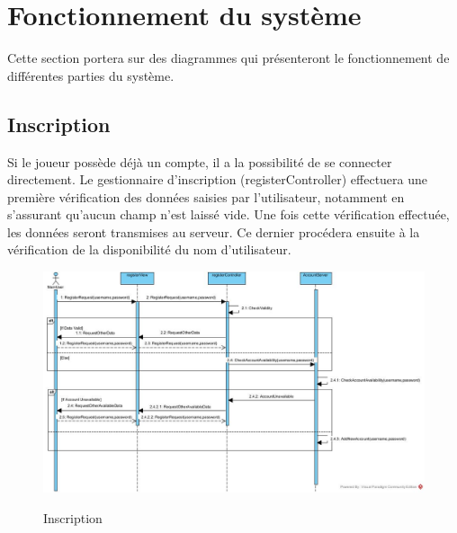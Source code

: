 \documentclass[../design_fonctionnement_sys.tex]{subfiles}
\begin{document}
\section{Fonctionnement du système}
Cette section portera sur des diagrammes qui présenteront le fonctionnement de différentes parties du système.

\subsection{Inscription}
Si le joueur possède déjà un compte, il a la possibilité de se connecter directement.
Le gestionnaire d'inscription (registerController) effectuera une première vérification des données saisies par l'utilisateur, 
notamment en s'assurant qu'aucun champ n'est laissé vide. 
Une fois cette vérification effectuée, les données seront transmises au serveur. 
Ce dernier procédera ensuite à la vérification de la disponibilité du nom d'utilisateur.

\begin{figure}[H]
    \centering
    \includegraphics[scale=0.4]{img_design/RegisterSD.jpg}
    \label{fig:seq_match_client}
    \caption{Inscription}
\end{figure}
\newpage
\end{document}
